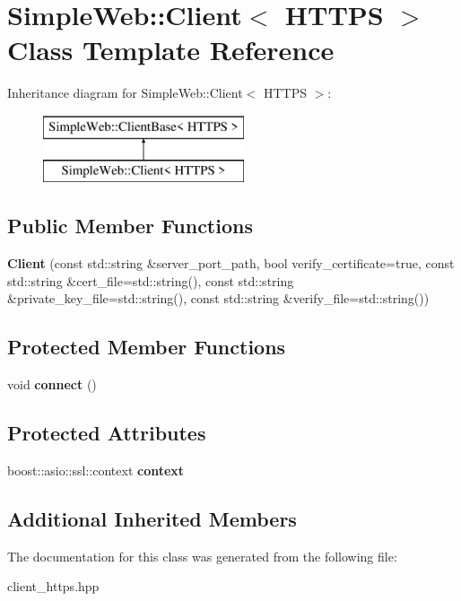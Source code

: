 \hypertarget{a00055}{}\section{Simple\+Web\+:\+:Client$<$ H\+T\+T\+PS $>$ Class Template Reference}
\label{a00055}
Inheritance diagram for Simple\+Web\+:\+:Client$<$ H\+T\+T\+PS $>$\+:\begin{figure}[H]
\begin{center}
\leavevmode
\includegraphics[height=2.000000cm]{a00055}
\end{center}
\end{figure}
\subsection*{Public Member Functions}
\begin{DoxyCompactItemize}
\item 
{\bfseries Client} (const std\+::string \&server\+\_\+port\+\_\+path, bool verify\+\_\+certificate=true, const std\+::string \&cert\+\_\+file=std\+::string(), const std\+::string \&private\+\_\+key\+\_\+file=std\+::string(), const std\+::string \&verify\+\_\+file=std\+::string())\hypertarget{a00055_abd87d3dc08c9fed3a60f18c749b8bacd}{}\label{a00055_abd87d3dc08c9fed3a60f18c749b8bacd}

\end{DoxyCompactItemize}
\subsection*{Protected Member Functions}
\begin{DoxyCompactItemize}
\item 
void {\bfseries connect} ()\hypertarget{a00055_a833f6fd136e3158b873bee024d6e188c}{}\label{a00055_a833f6fd136e3158b873bee024d6e188c}

\end{DoxyCompactItemize}
\subsection*{Protected Attributes}
\begin{DoxyCompactItemize}
\item 
boost\+::asio\+::ssl\+::context {\bfseries context}\hypertarget{a00055_afe57679cc6153d5d1fe8abc94a8fa58a}{}\label{a00055_afe57679cc6153d5d1fe8abc94a8fa58a}

\end{DoxyCompactItemize}
\subsection*{Additional Inherited Members}


The documentation for this class was generated from the following file\+:\begin{DoxyCompactItemize}
\item 
client\+\_\+https.\+hpp\end{DoxyCompactItemize}
